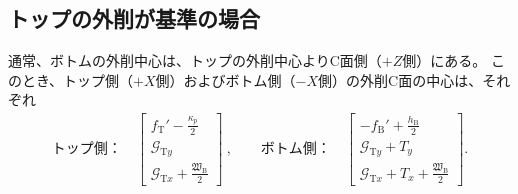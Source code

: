 \subsection{トップの外削が基準の場合}
通常、ボトムの外削中心は、トップの外削中心よりC面側（$+Z$側）にある。
このとき、トップ側（$+X$側）およびボトム側（$-X$側）の外削C面の中心は、それぞれ
\begin{align*}
  \text{トップ側：}\quad
  \left[
    \begin{array}{c}
      \displaystyle f_\mathrm T'-\frac{\kappa_p}2\\[5pt]
      \mathcal G_{\mathrm Ty}\\[3pt]
      \displaystyle \mathcal G_{\mathrm Tx}+\frac{\mathfrak W_\mathrm B}2
    \end{array}
    \right]~, \qquad
  \text{ボトム側：}\quad
  \left[
    \begin{array}{c}
      \displaystyle -f_\mathrm B'+\frac{h_\mathrm B}2\\[5pt]
      \mathcal G_{\mathrm Ty}+T_y\\[3pt]
      \displaystyle \mathcal G_{\mathrm Tx}+T_x+\frac{\mathfrak W_\mathrm B}2
    \end{array}
  \right].
\end{align*}



